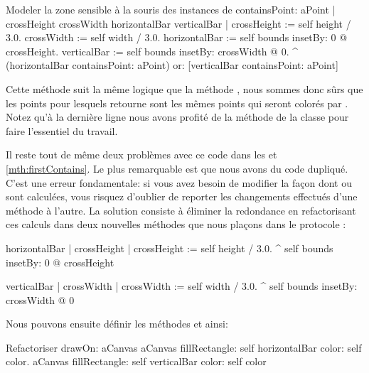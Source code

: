 \documentclass[a4paper,10pt,twoside]{book}
\begin{document}

\begin{method}[firstContains]{Modeler la zone sensible \`a la souris des instances de }
containsPoint: aPoint
	| crossHeight crossWidth horizontalBar verticalBar |
	crossHeight := self height / 3.0.
	crossWidth := self width / 3.0.
	horizontalBar := self bounds insetBy: 0 @ crossHeight.
	verticalBar := self bounds insetBy: crossWidth @ 0.
	^ (horizontalBar containsPoint: aPoint)
		or: [verticalBar containsPoint: aPoint]
\end{method}

Cette méthode suit la même logique que la méthode , 
nous sommes donc sûrs que les points pour lesquels
 retourne  sont les mêmes points qui
seront colorés par .
Notez qu'\`a 
la dernière ligne
nous avons profité de la méthode
de la classe  pour faire l'essentiel du travail.

Il reste tout de même deux problèmes avec ce code dans les 
 et \ref{mth:firstContains}.
Le plus remarquable est que nous avons du code dupliqué.
C'est une erreur fondamentale: si vous avez besoin de modifier la
façon dont  ou  sont
calculées, vous risquez d'oublier de reporter les changements
effectués d'une méthode \`a l'autre.
La solution consiste \`a éliminer la redondance en refactorisant ces
calculs dans deux nouvelles méthodes que nous plaçons dans le
protocole :

\begin{method}{}
horizontalBar
	| crossHeight |
	crossHeight := self height / 3.0.
	^ self bounds insetBy: 0 @ crossHeight
\end{method}

\begin{method}{}
verticalBar
	| crossWidth |
	crossWidth := self width / 3.0.
	^ self bounds insetBy: crossWidth @ 0
\end{method}

\noindent
Nous pouvons ensuite définir les méthodes  et
 ainsi:

\begin{method}{Refactoriser }
drawOn: aCanvas 
	aCanvas fillRectangle: self horizontalBar color: self color.
	aCanvas fillRectangle: self verticalBar color: self color
\end{method}
\end{document}
